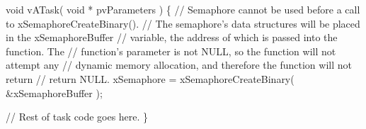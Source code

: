 \begin{DoxyPre}void vATask( void * pvParameters )
\{
   // Semaphore cannot be used before a call to xSemaphoreCreateBinary().
   // The semaphore's data structures will be placed in the xSemaphoreBuffer
   // variable, the address of which is passed into the function.  The
   // function's parameter is not NULL, so the function will not attempt any
   // dynamic memory allocation, and therefore the function will not return
   // return NULL.
   xSemaphore = xSemaphoreCreateBinary( \&xSemaphoreBuffer );\end{DoxyPre}



\begin{DoxyPre}   // Rest of task code goes here.
\}
\end{DoxyPre}
 